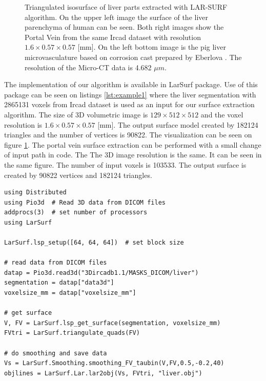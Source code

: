 \begin{figure}
\caption{
Triangulated isosurface of liver parts extracted with LAR-SURF algorithm. 
On the upper left image the surface of the liver parenchyma of human can be seen. 
Both right images show the Portal Vein from the same Ircad dataset \cite{ircad} 
with resolution $1.6\times0.57\times0.57$ [mm].
On the left bottom image is the pig liver microvasculature based on corrosion cast prepared by Eberlova
\cite{eberlova2017use}. The resolution of the Micro-CT data is 4.682 $\mu{}m$.
} \label{fig:example_liver_macro_micro}
\end{figure}


The implementation of our algorithm is available in LarSurf package. 
Use of this package can be seen on listings \ref{lst:example1} where the liver segmentation with 2865131 voxels from
Ircad dataset is used as an input for our surface extraction algorithm. The size of 3D volumetric 
image is $129 \times 512 \times 512$
and the voxel resolution is $1.6\times0.57\times0.57$ [mm]. 
The output surface model created by  182124 triangles and the number of vertices is 90822. The visualization can 
be seen on figure \ref{fig:example_liver_macro_micro}. 
The portal vein surface extraction can be performed with a small change of input path in code.
The The 3D image resolution is the same. 
It can be seen in the same figure. 
The number of input voxels is 103533. 
The output surface is created by 90822 vertices and 182124 triangles. 

\begin{lstlisting}[caption={Get surface from DICOM volumetric data}, label={lst:example1}]
using Distributed
using Pio3d  # Read 3D data from DICOM files
addprocs(3)  # set number of processors
using LarSurf

LarSurf.lsp_setup([64, 64, 64])  # set block size

# read data from DICOM files
datap = Pio3d.read3d("3Dircadb1.1/MASKS_DICOM/liver")
segmentation = datap["data3d"]
voxelsize_mm = datap["voxelsize_mm"]

# get surface
V, FV = LarSurf.lsp_get_surface(segmentation, voxelsize_mm)
FVtri = LarSurf.triangulate_quads(FV)

# do smoothing and save data
Vs = LarSurf.Smoothing.smoothing_FV_taubin(V,FV,0.5,-0.2,40)
objlines = LarSurf.Lar.lar2obj(Vs, FVtri, "liver.obj")
\end{lstlisting}

